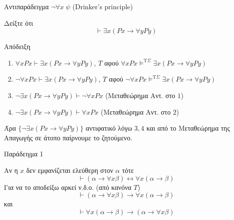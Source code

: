 \documentclass{beamer}
\begin{document}
\begin{frame}{Αντιπαράδειγμα $\neg\forall x \; \psi$ (Drinker's principle)}
  \begin{block}{}
  Δείξτε ότι
  \[
    \vdash \exists x (Px \rightarrow \forall y Py)
  \]
  \end{block}
  \begin{block}{Απόδειξη}
    \begin{enumerate}
      \item $\forall x Px \vdash \exists x (Px \rightarrow \forall y Py)$, $T$ αφού $\forall x Px \models^{\textrm{T}\Sigma} \exists x (Px \rightarrow \forall y Py)$
      \item $\neg\forall x Px \vdash \exists x (Px \rightarrow \forall y Py)$, $T$ αφού $\neg\forall x Px \models^{\textrm{T}\Sigma} \exists x (Px \rightarrow \forall y Py)$
      \item $\neg\exists x (Px \rightarrow \forall y Py) \vdash \neg\forall x Px$ (Μεταθεώρημα Αντ. στο $1$)
      \item $\neg\exists x (Px \rightarrow \forall y Py) \vdash \forall x Px$ (Μεταθεώρημα Αντ. στο $2$)
    \end{enumerate}
    Άρα $\{\neg\exists x (Px \rightarrow \forall y Py)\}$ αντιφατικό λόγω $3,4$ και από το Μεταθεώρημα της Απαγωγής σε άτοπο παίρνουμε το ζητούμενο.
  \end{block}
\end{frame}

\begin{frame}{Παράδειγμα 1}
  \begin{block}{}
    Αν η $x$ δεν εμφανίζεται ελεύθερη στον $\alpha$ τότε
    \[
      \vdash (\alpha \rightarrow \forall x \beta) \leftrightarrow \forall x (\alpha \rightarrow \beta)
    \]
    Για να το αποδείξω αρκεί ν.δ.ο. (από κανόνα $T$)
    \[
      \vdash (\alpha \rightarrow \forall x \beta) \rightarrow \forall x (\alpha \rightarrow \beta)
    \]
    και
    \[
      \vdash \forall x (\alpha \rightarrow \beta) \rightarrow (\alpha \rightarrow \forall x \beta)
    \]
  \end{block}
\end{frame}
\end{document}
